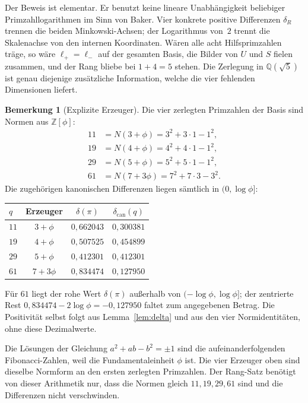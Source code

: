 \documentclass[11pt,a4paper]{article}
\theoremstyle{plain}
\theoremstyle{definition}
\newtheorem{remark}[theorem]{Bemerkung}
\newcommand{\Z}{\mathbb{Z}}
\newcommand{\Q}{\mathbb{Q}}
\numberwithin{equation}{section}
\begin{document}
Der Beweis ist elementar.
Er benutzt keine lineare Unabhängigkeit beliebiger Primzahllogarithmen im
Sinn von Baker.
Vier konkrete positive Differenzen $\delta_R$ trennen die beiden
Minkowski-Achsen; der Logarithmus von~$2$ trennt die Skalenachse von den
internen Koordinaten.
Wären alle acht Hilfsprimzahlen träge, so wäre $\ell_+=\ell_-$ auf der
gesamten Basis, die Bilder von $U$ und $S$ fielen zusammen, und der Rang
bliebe bei $1+4=5$ stehen.
Die Zerlegung in $\Q(\sqrt{5})$ ist genau diejenige zusätzliche Information,
welche die vier fehlenden Dimensionen liefert.

\begin{remark}[Explizite Erzeuger]
Die vier zerlegten Primzahlen der Basis sind Normen aus $\Z[\phi]$:
\begin{align*}
11&=N(3+\phi)=3^2+3\cdot 1-1^2,\\
19&=N(4+\phi)=4^2+4\cdot 1-1^2,\\
29&=N(5+\phi)=5^2+5\cdot 1-1^2,\\
61&=N(7+3\phi)=7^2+7\cdot 3-3^2.
\end{align*}
Die zugehörigen kanonischen Differenzen liegen sämtlich in $(0,\log\phi]$:
\begin{center}
\begin{tabular}{@{}lccc@{}}
\toprule
$q$ & Erzeuger & $\delta(\pi)$ & $\delta_{\mathrm{can}}(q)$\\
\midrule
$11$ & $3+\phi$ & $0{,}662043$ & $0{,}300381$\\
$19$ & $4+\phi$ & $0{,}507525$ & $0{,}454899$\\
$29$ & $5+\phi$ & $0{,}412301$ & $0{,}412301$\\
$61$ & $7+3\phi$ & $0{,}834474$ & $0{,}127950$\\
\bottomrule
\end{tabular}
\end{center}
Für $61$ liegt der rohe Wert $\delta(\pi)$ außerhalb von $(-\log\phi,\log\phi]$;
der zentrierte Rest $0{,}834474-2\log\phi=-0{,}127950$ faltet zum angegebenen
Betrag.
Die Positivität selbst folgt aus Lemma~\ref{lem:delta} und aus den vier
Normidentitäten, ohne diese Dezimalwerte.
\end{remark}

Die Lösungen der Gleichung $a^2+ab-b^2=\pm 1$ sind die aufeinanderfolgenden
Fibonacci-Zahlen, weil die Fundamentaleinheit $\phi$ ist.
Die vier Erzeuger oben sind dieselbe Normform an den ersten zerlegten
Primzahlen.
Der Rang-Satz benötigt von dieser Arithmetik nur, dass die Normen gleich
$11,19,29,61$ sind und die Differenzen nicht verschwinden.
\end{document}
